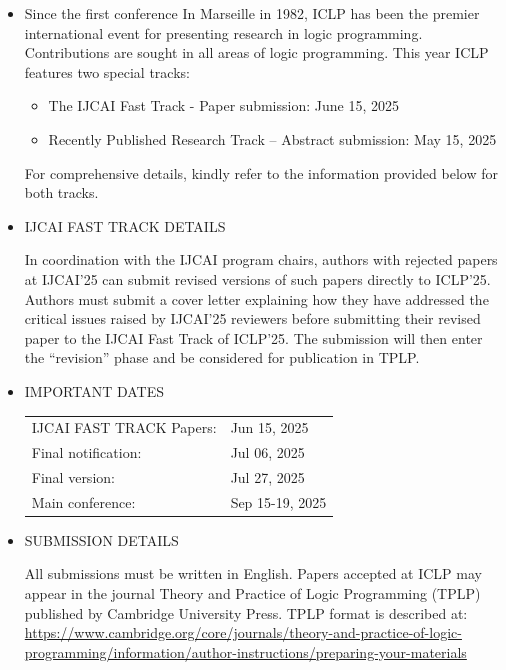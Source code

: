\documentclass[prodmode,acmtecs]{acmsmall} %
\begin{document}
\begin{itemize}\item  Since the first conference In Marseille in 1982, ICLP has been the premier international event for presenting research in logic programming. Contributions are sought in all areas of logic programming. This year ICLP features two special tracks: 
 
\begin{itemize}\item  The IJCAI Fast Track - Paper submission: June 15, 2025
\item Recently Published Research Track – Abstract submission: May 15, 2025
\end{itemize} 
  For comprehensive details, kindly refer to the information provided below for both tracks. 
 
\item  IJCAI FAST TRACK DETAILS 
 
  In coordination with the IJCAI program chairs, authors with rejected papers at IJCAI’25 can submit revised versions of such papers directly to ICLP’25. Authors must submit a cover letter explaining how they have addressed the critical issues raised by IJCAI’25 reviewers before submitting their revised paper to the IJCAI Fast Track of ICLP’25. The submission will then enter the “revision” phase and be considered for publication in TPLP. 
 
\item  IMPORTANT DATES 
 
\begin{tabulary}{\linewidth}{LL}IJCAI FAST TRACK Papers:  & Jun 15, 2025 \\
Final notification:  & Jul 06, 2025 \\
Final version:  & Jul 27, 2025 \\
Main conference:  & Sep 15-19, 2025 \\
\end{tabulary}
 
\item  SUBMISSION DETAILS 
 
  All submissions must be written in English. Papers accepted at ICLP may appear in the journal Theory and Practice of Logic Programming (TPLP) published by Cambridge University Press. TPLP format is described at: \href{https://www.cambridge.org/core/journals/theory-and-practice-of-logic-programming/information/author-instructions/preparing-your-materials}{https://www.cambridge.org/core/journals/theory-and-practice-of-logic-programming/information/author-instructions/preparing-your-materials} 
 

\end{itemize}
\end{document}
